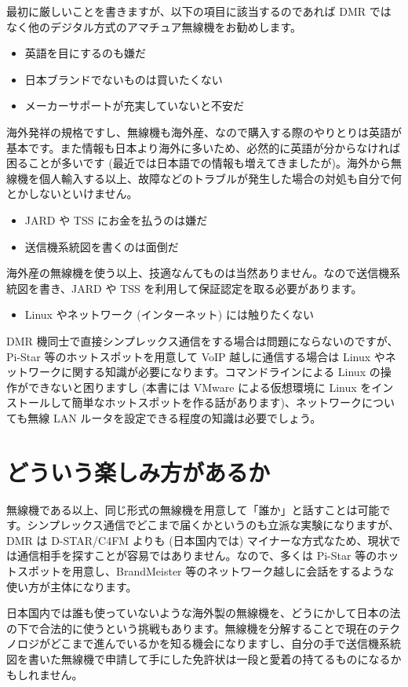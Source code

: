 \documentclass[a4j,oneside]{ujbook}
\begin{document}
最初に厳しいことを書きますが、以下の項目に該当するのであれば DMR ではなく他のデジタル方式のアマチュア無線機をお勧めします。
\begin{itemize}
 \item 英語を目にするのも嫌だ
 \item 日本ブランドでないものは買いたくない
 \item メーカーサポートが充実していないと不安だ
\end{itemize}
海外発祥の規格ですし、無線機も海外産、なので購入する際のやりとりは英語が基本です。また情報も日本より海外に多いため、必然的に英語が分からなければ困ることが多いです (最近では日本語での情報も増えてきましたが)。海外から無線機を個人輸入する以上、故障などのトラブルが発生した場合の対処も自分で何とかしないといけません。
\begin{itemize}
 \item JARD や TSS にお金を払うのは嫌だ
 \item 送信機系統図を書くのは面倒だ
\end{itemize}
海外産の無線機を使う以上、技適なんてものは当然ありません。なので送信機系統図を書き、JARD や TSS を利用して保証認定を取る必要があります。
\begin{itemize}
 \item Linux やネットワーク (インターネット) には触りたくない
\end{itemize}
DMR 機同士で直接シンプレックス通信をする場合は問題にならないのですが、Pi-Star 等のホットスポットを用意して VoIP 越しに通信する場合は Linux やネットワークに関する知識が必要になります。コマンドラインによる Linux の操作ができないと困りますし (本書には VMware による仮想環境に Linux をインストールして簡単なホットスポットを作る話があります)、ネットワークについても無線 LAN ルータを設定できる程度の知識は必要でしょう。

\section{どういう楽しみ方があるか}

無線機である以上、同じ形式の無線機を用意して「誰か」と話すことは可能です。シンプレックス通信でどこまで届くかというのも立派な実験になりますが、DMR は D-STAR/C4FM よりも (日本国内では) マイナーな方式なため、現状では通信相手を探すことが容易ではありません。なので、多くは Pi-Star 等のホットスポットを用意し、BrandMeister 等のネットワーク越しに会話をするような使い方が主体になります。

日本国内では誰も使っていないような海外製の無線機を、どうにかして日本の法の下で合法的に使うという挑戦もあります。無線機を分解することで現在のテクノロジがどこまで進んでいるかを知る機会になりますし、自分の手で送信機系統図を書いた無線機で申請して手にした免許状は一段と愛着の持てるものになるかもしれません。
\end{document}
